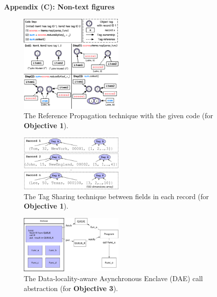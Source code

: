 \documentclass[9pt,a4]{article}
\begin{document}
\textbf{Appendix (C): Non-text figures}
\vspace{0.1in}

\begin{figure}[h]
   \center
\includegraphics[width=0.45\textwidth]{figures/reference}
\vspace{-0.1in}
\caption{The Reference Propagation technique with the given code (for 
\textbf{Objective 1}).}
\label{fig:reference}
\end{figure}
\vspace{0.1in}

\begin{figure}[h]
   \center
\includegraphics[width=0.45\textwidth]{figures/tagcache}
\caption{The Tag Sharing technique between fields in each record (for 
\textbf{Objective 1}).}
\label{fig:tagcache}
\end{figure}
\vspace{0.1in}

\begin{figure}[h]
   \center
   \includegraphics[width=0.45\textwidth]{figures/async_call}
 \caption{The Data-locality-aware Asynchronous Enclave (DAE) call abstraction 
(for 
\textbf{Objective 3}).}
   \label{fig:async-call}
 \end{figure}

% 
% 

\end{document}
